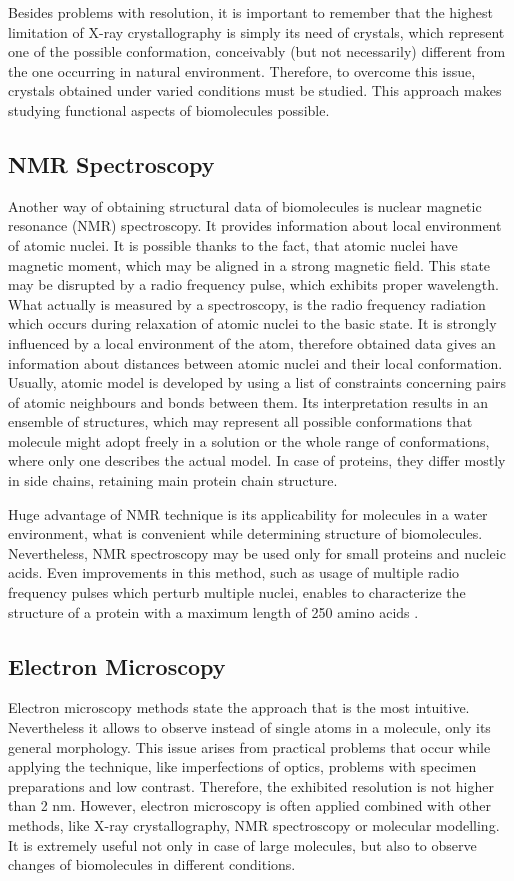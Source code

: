 Besides problems with resolution, it is important to remember that the highest limitation of X-ray crystallography is simply its need of crystals, which represent one of the possible conformation, conceivably (but not necessarily) different from the one occurring in natural environment. Therefore, to overcome this issue, crystals obtained under varied conditions must be studied. This approach makes studying functional aspects of biomolecules possible.
\subsection{NMR Spectroscopy} %
Another way of obtaining structural data of biomolecules is nuclear magnetic resonance (NMR) spectroscopy. It provides information about local environment of atomic nuclei. It is possible thanks to the fact, that atomic nuclei have magnetic moment, which may be aligned in a strong magnetic field. This state may be disrupted by a radio frequency pulse, which exhibits proper wavelength. What actually is measured by a spectroscopy, is the radio frequency radiation which occurs during relaxation of atomic nuclei to the basic state. It is strongly influenced by a local environment of the atom, therefore obtained data gives an information about distances between atomic nuclei and their local conformation. Usually, atomic model is developed by using a list of constraints concerning pairs of atomic neighbours and bonds between them. Its interpretation results in an ensemble of structures, which may represent all possible conformations that molecule might adopt freely in a solution or the whole range of conformations, where only one describes the actual model. In case of proteins, they differ mostly in side chains, retaining main protein chain structure.

Huge advantage of NMR technique is its applicability for molecules in a water environment, what is convenient while determining structure of biomolecules. Nevertheless, NMR spectroscopy may be used only for small proteins and nucleic acids. Even improvements in this method, such as usage of multiple radio frequency pulses which perturb multiple nuclei, enables to characterize the structure of a protein with a maximum length of 250 amino acids \cite{Goodsell04}.
 
\subsection{Electron Microscopy} %
Electron microscopy methods state the approach that is the most intuitive. Nevertheless it allows to observe instead of single atoms in a molecule, only its general morphology. This issue arises from practical problems that occur while applying the technique, like imperfections of optics, problems with specimen preparations and low contrast. Therefore, the exhibited resolution is not higher than 2 nm. However, electron microscopy is often applied combined with other methods, like X-ray crystallography, NMR spectroscopy or molecular modelling. It is extremely useful not only in case of large molecules, but also to observe changes of biomolecules in different conditions. 
